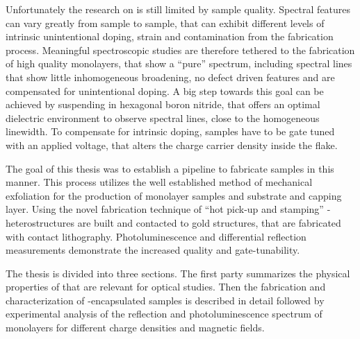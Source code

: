 Unfortunately the research on \tmds is still limited by sample quality. Spectral features can vary greatly from sample to sample, that can exhibit different levels of intrinsic unintentional doping, strain and contamination from the fabrication process. Meaningful spectroscopic studies are therefore tethered to the fabrication of high quality monolayers, that show a ``pure'' spectrum, including spectral lines that show little inhomogeneous broadening, no defect driven features and are compensated for unintentional doping. A big step towards this goal can be achieved by suspending \tmds in hexagonal boron nitride, that offers an optimal dielectric environment to observe spectral lines, close to the homogeneous linewidth\cite{dean_boron_2010,cadiz_excitonic_2017}. To compensate for intrinsic doping, samples have to be gate tuned with an applied voltage, that alters the charge carrier density inside the flake.

The goal of this thesis was to establish a pipeline to fabricate samples in this manner. This process utilizes the well established method of mechanical exfoliation for the production of \tmdg monolayer samples and \hbng substrate and capping layer. Using the novel fabrication technique of ``hot pick-up and stamping'' \hbn-\tmdg heterostructures are built and contacted to gold structures, that are fabricated with contact lithography. Photoluminescence and differential reflection measurements demonstrate the increased quality and gate-tunability.

The thesis is divided into three sections. The first party summarizes the physical properties of \tmds that are relevant for optical studies. Then the fabrication and characterization of \hbn-encapsulated samples is described in detail followed by experimental analysis of the reflection and photoluminescence spectrum of \wse monolayers for different charge densities and magnetic fields.




